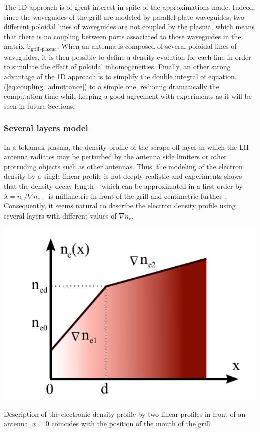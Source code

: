 The 1D approach is of great interest in spite of the approximations made. Indeed, since the waveguides of the grill are modeled by parallel plate waveguides, two different poloidal lines of waveguides are not coupled by the plasma, which means that there is no coupling between ports associated to those waveguides in the matrix $\mathbb{S}_{\mbox{grill/plasma}}$. When an antenna is composed of several poloidal lines of waveguides, it is then possible to define a density evolution for each line in order to simulate the effect of poloidal inhomogeneities. Finally, an other strong advantage of the 1D approach is to simplify the double integral of equation.(\ref{eq:coupling_admittance}) to a simple one, reducing dramatically the computation time while keeping a good agreement with experiments as it will be seen in future Sections.


\subsubsection{Several layers model}\label{sec_several_layers_model}

In a tokamak plasma, the density profile of the scrape-off layer in which the LH antenna radiates may be perturbed by the antenna side limiters or other protruding objects such as other antennas. Thus, the modeling of the electron density by a single linear profile is not deeply realistic and experiments shows that the density decay length -- which can be approximated in a first order by $\lambda=n_{e}/\nabla n_{e}$  -- is millimetric in front of the grill and centimetric further . Consequently, it seems natural to describe the electron density profile using several layers with different values of $\nabla n_{e}$.

\begin{marginfigure}
	\includegraphics[width=1.0\textwidth]{figures/chap2/ALOHA/figure3}
	\caption{Description of the electronic density profile by two linear profiles
		in front of an antenna. $x=0$ coincides with the position of the
		mouth of the grill.\label{fig:Electron-density-profile} }
\end{marginfigure}

